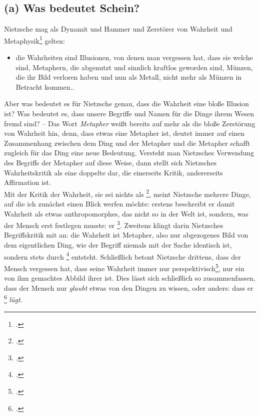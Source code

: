 \documentclass[12pt, a4paper, openany]{report}
\begin{document}
\subsection{(a) Was bedeutet Schein?}
Nietzsche mag als Dynamit und Hammer und Zerstörer von Wahrheit und Metaphysik\footcite[Vgl.][59]{stephan_nietzscheanismus_2019} gelten: 
\begin{itemize}
    \item[] die Wahrheiten sind Illusionen, von denen man vergessen hat, dass sie welche sind, Metaphern, die abgenutzt und sinnlich kraftlos geworden sind, Münzen, die ihr Bild verloren haben und nun als Metall, nicht mehr als Münzen in Betracht kommen.. 
\end{itemize}
Aber was bedeutet es für Nietzsche genau, dass die Wahrheit eine bloße Illusion ist? 
Was bedeutet es, dass unsere Begriffe und Namen für die Dinge ihrem Wesen fremd sind?
-- Das Wort \emph{Metapher} weißt bereits auf mehr als die bloße Zerstörung von Wahrheit hin, denn, dass etwas eine Metapher ist, deutet immer auf einen Zusammenhang zwischen dem Ding und der Metapher und die Metapher schafft zugleich für das Ding eine neue Bedeutung. 
Versteht man Nietzsches Verwendung des Begriffs der Metapher auf diese Weise, dann stellt sich Nietzsches Wahrheitskritik als eine doppelte dar, die einerseits Kritik, andererseits Affirmation ist.\\

Mit der Kritik der Wahrheit, sie sei nichts als \footcite[][880]{nietzsche_geburt_1999}, meint Nietzsche mehrere Dinge, auf die ich zunächst einen Blick werfen möchte: 
erstens beschreibt er damit Wahrheit als etwas anthropomorphes, das nicht so in der Welt ist, sondern, was der Mensch erst festlegen musste: er \footcite[][877]{nietzsche_geburt_1999}.
Zweitens klingt darin Nietzsches Begriffskritik mit an:
die Wahrheit ist Metapher, also nur abgezogenes Bild von dem eigentlichen Ding, wie der Begriff niemals mit der Sache identisch ist, sondern stets durch \footcite[][880]{nietzsche_geburt_1999} entsteht.
Schließlich betont Nietzsche drittens, dass der Mensch vergessen hat, dass seine Wahrheit immer nur perspektivisch\footcite[Vgl.][364]{nietzsche_jenseits_2014}, nur ein von ihm gemachtes Abbild ihrer ist. 
Dies lässt sich schließlich so zusammenfassen, dass der Mensch nur \emph{glaubt} etwas von den Dingen zu wissen, oder anders: dass er \footcite[][881]{nietzsche_geburt_1999} \emph{lügt}.\\
\end{document}
